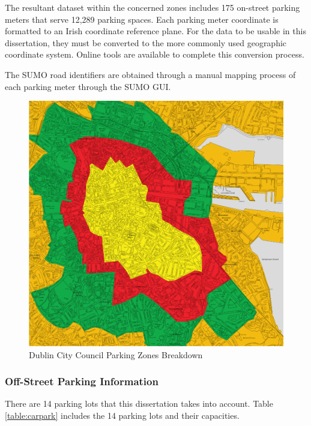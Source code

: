 The resultant dataset within the concerned zones includes 175 on-street parking meters that serve 12,289 parking spaces. Each parking meter coordinate is formatted to an Irish coordinate reference plane. For the data to be usable in this dissertation, they must be converted to the more commonly used geographic coordinate system. Online tools are available to complete this conversion process.

The SUMO road identifiers are obtained through a manual mapping process of each parking meter through the SUMO GUI.

\begin{figure}[H]
    \centering
    \includegraphics[width=1\textwidth]{./Images/DUBLINZONES.PNG}
    \caption{Dublin City Council Parking Zones Breakdown}
    \label{fig:DUBLINZONES}
\end{figure}

\pagebreak 

\subsubsection{Off-Street Parking Information}\label{ssec:car_par_cap}
There are 14 parking lots that this dissertation takes into account. Table \ref{table:carpark} includes the 14 parking lots and their capacities.

